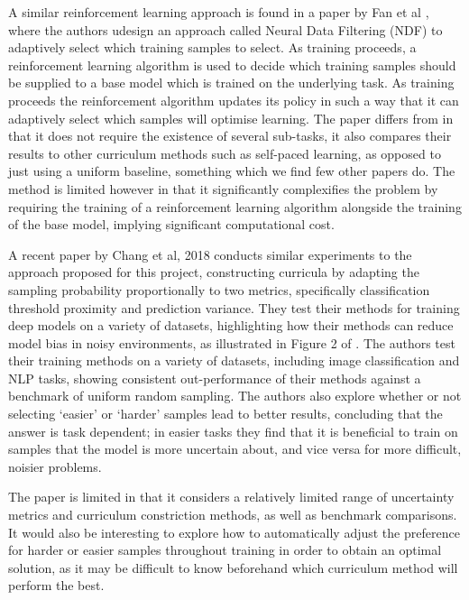 \documentclass[a4paper,11pt]{article}
\begin{document}
A similar reinforcement learning approach is found in a paper by Fan et al \cite{Fan 17}, where the authors udesign an approach called Neural Data Filtering (NDF) to adaptively select which training samples to select. As training proceeds, a reinforcement learning algorithm is used to decide which training samples should be supplied to a base model which is trained on the underlying task. As training proceeds the reinforcement algorithm updates its policy in such a way that it can adaptively select which samples will optimise learning. The paper differs from \cite{Graves 2017} in that it does not require the existence of several sub-tasks, it also compares their results to other curriculum methods such as self-paced learning, as opposed to just using a uniform baseline, something which we find few other papers do. The method is limited however in that it significantly complexifies the problem by requiring the training of a reinforcement learning algorithm alongside the training of the base model, implying significant computational cost. 

A recent paper by Chang et al, 2018 \cite{Chang 18} conducts similar experiments to the approach proposed for this project, constructing curricula by adapting the sampling probability proportionally to two metrics, specifically classification threshold proximity and prediction variance. They test their methods for training deep models on a variety of datasets, highlighting how their methods can reduce model bias in noisy environments, as illustrated in Figure 2 of \cite{Chang 18}. The authors test their training methods on a variety of datasets, including image classification and NLP tasks, showing consistent out-performance of their methods against a benchmark of uniform random sampling. The authors also explore whether or not selecting `easier' or `harder' samples lead to better results, concluding that the answer is task dependent; in easier tasks they find that it is beneficial to train on samples that the model is more uncertain about, and vice versa for more difficult, noisier problems. 

The paper is limited in that it considers a relatively limited range of uncertainty metrics and curriculum constriction methods, as well as benchmark comparisons. It would also be interesting to explore how to automatically adjust the preference for harder or easier samples throughout training in order to obtain an optimal solution, as it may be difficult to know beforehand which curriculum method will perform the best. 
\vspace{0.5cm}
\end{document}
